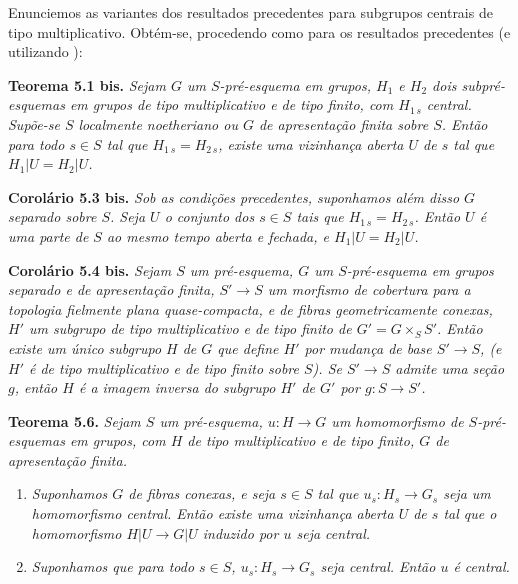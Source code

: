 Enunciemos as variantes dos resultados precedentes para
subgrupos centrais de tipo multiplicativo. Obtém-se, procedendo
como para os resultados precedentes (e utilizando
):

\medskip
\noindent{}\textbf{Teorema 5.1 bis.}
\textit{Sejam \(G\) um \(S\)-pré-esquema em grupos, \(H_1\)
e \(H_2\) dois subpré-esquemas em grupos de tipo multiplicativo
e de tipo finito, com \(H_{1\,s}\) central. Supõe-se \(S\)
localmente noetheriano ou \(G\) de apresentação finita sobre
\(S\). Então para todo \(s\in S\) tal que \(H_{1\,s}=H_{2\,s}\),
existe uma vizinhança aberta \(U\) de \(s\) tal que
\(H_1|U=H_2|U\).}

\medskip
\noindent{}\textbf{Corolário 5.3 bis.}
\textit{Sob as condições precedentes, suponhamos além disso
\(G\) separado sobre \(S\). Seja \(U\) o conjunto dos
\(s\in S\) tais que \(H_{1\,s}=H_{2\,s}\). Então \(U\)
é uma parte de \(S\) ao mesmo tempo aberta e fechada, e
\(H_1|U=H_2|U\).}

\medskip
\noindent{}\textbf{Corolário 5.4 bis.}
\textit{Sejam \(S\) um pré-esquema, \(G\) um \(S\)-pré-esquema
em grupos separado e de apresentação finita, \(S'\to S\) um
morfismo de cobertura para a topologia fielmente plana
quase-compacta, e de fibras geometricamente conexas, \(H'\)
um subgrupo de tipo multiplicativo e de tipo finito de
\(G'=G\times_SS'\). Então existe um único subgrupo \(H\) de
\(G\) que define \(H'\) por mudança de base \(S'\to S\), (e
\(H'\) é de tipo multiplicativo e de tipo finito sobre \(S\)).
Se \(S'\to S\) admite uma seção \(g\), então \(H\) é a imagem
inversa do subgrupo \(H'\) de \(G'\) por \(g:S\to S'\).}

\medskip
\noindent{}\textbf{Teorema 5.6.}
\textit{Sejam \(S\) um pré-esquema, \(u:H\to G\) um
homomorfismo de \(S\)-pré-esquemas em grupos, com \(H\) de tipo
multiplicativo e de tipo finito, \(G\) de apresentação finita.}
\begin{enumerate}
  \item[a)]
  \textit{Suponhamos \(G\) de fibras conexas, e seja \(s\in S\)
  tal que \(u_s:H_s\to G_s\) seja um homomorfismo central.
  Então existe uma vizinhança aberta \(U\) de \(s\) tal que
  o homomorfismo \(H|U\to G|U\) induzido por \(u\) seja central.}

  \item[b)]
  \textit{Suponhamos que para todo \(s\in S\), \(u_s:H_s\to G_s\)
  seja central. Então \(u\) é central.}
\end{enumerate}

